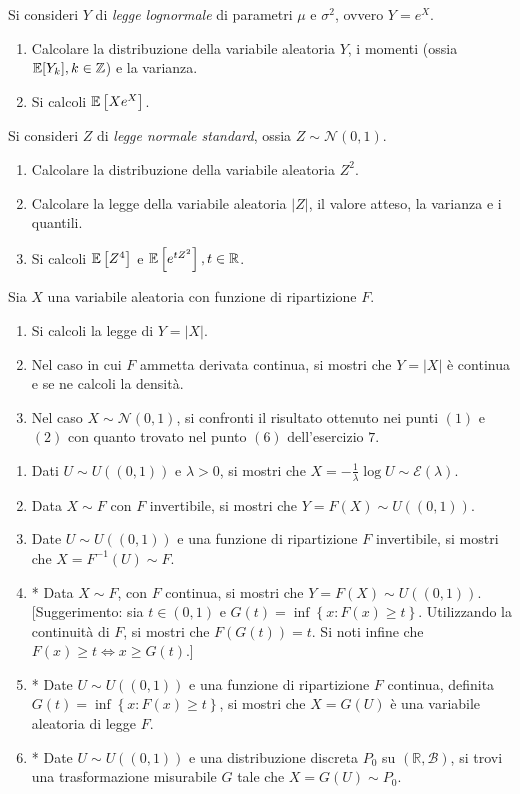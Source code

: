 Si consideri $Y$ di \textit{legge lognormale} di parametri $\mu $ e $\sigma ^{2}$, ovvero $Y=e^{X}$.
\begin{enumerate}
\item Calcolare la distribuzione della variabile aleatoria $Y$, i momenti (ossia $\mathbb{E}[ Y_{k}] ,k\in \mathbb{Z}$) e la varianza.
\item Si calcoli $\mathbb{E}\left[ Xe^{X}\right]$.
\end{enumerate}

Si consideri $Z$ di \textit{legge normale standard}, ossia $Z\sim \mathcal{N}( 0,1)$.
\begin{enumerate}
\item Calcolare la distribuzione della variabile aleatoria $Z^{2}$.
\item Calcolare la legge della variabile aleatoria $| Z| $, il valore atteso, la varianza e i quantili.
\item Si calcoli $\mathbb{E}\left[ Z^{4}\right]$ e $\mathbb{E}\left[ e^{tZ^{2}}\right] ,t\in \mathbb{R}$.
\end{enumerate}
\Esercizio{}

Sia $X$ una variabile aleatoria con funzione di ripartizione $F$.
\begin{enumerate}
\item Si calcoli la legge di $Y=| X| $.
\item Nel caso in cui $F$ ammetta derivata continua, si mostri che $Y=| X| $ è continua e se ne calcoli la densità.
\item Nel caso $X\sim \mathcal{N}( 0,1)$, si confronti il risultato ottenuto nei punti $( 1)$ e $( 2)$ con quanto trovato nel punto $( 6)$ dell'esercizio $7$.
\end{enumerate}
\Esercizio{}
\begin{enumerate}
\item Dati $U\sim U(( 0,1))$ e $\lambda  >0$, si mostri che $X=-\frac{1}{\lambda }\log U\sim \mathcal{E}( \lambda )$.
\item Data $X\sim F$ con $F$ invertibile, si mostri che $Y=F( X) \sim U(( 0,1))$.
\item Date $U\sim U(( 0,1))$ e una funzione di ripartizione $F$ invertibile, si mostri che $X=F^{-1}( U) \sim F$.
\item * Data $X\sim F$, con $F$ continua, si mostri che $Y=F( X) \sim U(( 0,1))$. [Suggerimento: sia $t\in \left( 0,1\right)$ e $G\left( t\right) =\inf\left\{x:F\left( x\right) \geq t\right\}$. Utilizzando la continuità di $F$, si mostri che $F\left( G\left( t\right)\right) =t$. Si noti infine che $F\left( x\right) \geq t\iff x\geq G\left( t\right)$.]
\item * Date $U\sim U\left(\left( 0,1\right)\right)$ e una funzione di ripartizione $F$ continua, definita $G\left( t\right) =\inf\left\{x:F\left( x\right) \geq t\right\}$, si mostri che $X=G\left( U\right)$ è una variabile aleatoria di legge $F$.
\item * Date $U\sim U(( 0,1))$ e una distribuzione discreta $P_{0}$ su $\left(\mathbb{R} ,\mathcal{B}\right)$, si trovi una trasformazione misurabile $G$ tale che $X=G\left( U\right) \sim P_{0}$.
\end{enumerate}
